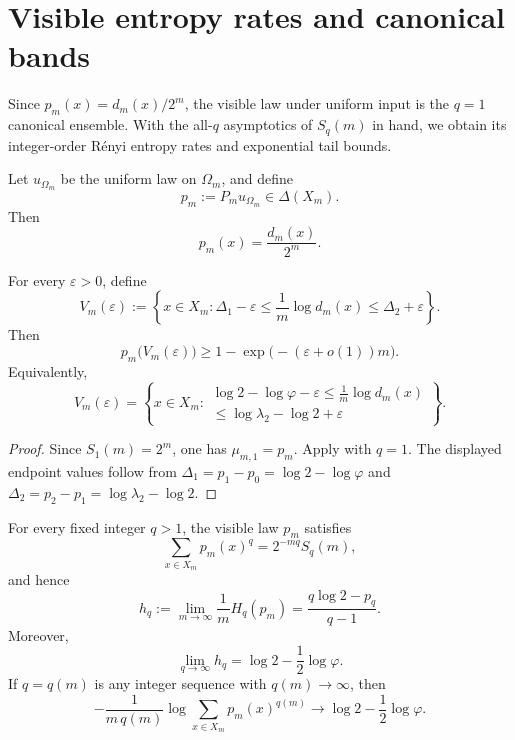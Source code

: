 \section{Visible entropy rates and canonical bands}\label{sec:ledger}

Since \(p_m(x)=d_m(x)/2^m\), the visible law under uniform input is the
\(q=1\) canonical ensemble.  With the all-\(q\) asymptotics of \(S_q(m)\) in
hand, we obtain its integer-order R\'enyi entropy rates
\cite{CoverThomas2006} and exponential tail bounds.

\begin{definition}
\label{def:visible-law}
Let \(u_{\Omega_m}\) be the uniform law on \(\Omega_m\), and define
\[
  p_m:=P_mu_{\Omega_m}\in\Delta(X_m).
\]
Then
\[
  p_m(x)=\frac{d_m(x)}{2^m}.
\]
\end{definition}

\begin{corollary}
\label{cor:visible-band}
For every \(\varepsilon>0\), define
\[
  V_m(\varepsilon)
  :=
  \left\{
    x\in X_m:
    \Delta_1-\varepsilon\le \frac1m\log d_m(x)\le \Delta_2+\varepsilon
  \right\}.
\]
Then
\[
  p_m\bigl(V_m(\varepsilon)\bigr)
  \ge
  1-\exp\bigl(-(\varepsilon+o(1))m\bigr).
\]
Equivalently,
\[
  V_m(\varepsilon)
  =
  \left\{
    x\in X_m:
    \begin{array}{c}
      \log 2-\log\varphi-\varepsilon
      \le
      \frac1m\log d_m(x) \\[2pt]
      \le
      \log\lambda_2-\log 2+\varepsilon
    \end{array}
  \right\}.
\]
\end{corollary}

\begin{proof}
Since \(S_1(m)=2^m\), one has \(\mu_{m,1}=p_m\).  Apply
 with \(q=1\).  The displayed endpoint values follow
from \(\Delta_1=p_1-p_0=\log 2-\log\varphi\) and
\(\Delta_2=p_2-p_1=\log\lambda_2-\log 2\).
\end{proof}

\begin{theorem}
\label{thm:renyi-entropy-rate}
For every fixed integer \(q>1\), the visible law \(p_m\) satisfies
\[
  \sum_{x\in X_m} p_m(x)^q = 2^{-m q} S_q(m),
\]
and hence
\[
  h_q
  :=
  \lim_{m\to\infty}\frac{1}{m}H_q(p_m)
  =
  \frac{q\log 2-p_q}{q-1}.
\]
Moreover,
\[
  \lim_{q\to\infty} h_q
  =
  \log 2-\frac12\log\varphi.
\]
If \(q=q(m)\) is any integer sequence with \(q(m)\to\infty\), then
\[
  -\frac{1}{m\,q(m)}\log \sum_{x\in X_m} p_m(x)^{q(m)}
  \to
  \log 2-\frac12\log\varphi.
\]
\end{theorem}

